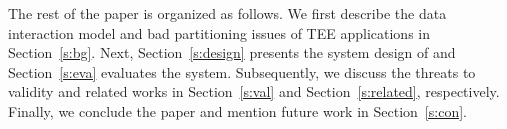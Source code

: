 The rest of the paper is organized as follows. We first describe the data interaction model and bad partitioning issues of TEE applications in Section~\ref{s:bg}. Next, Section~\ref{s:design} presents the system design of \ccSysName and Section~\ref{s:eva} evaluates the system. Subsequently, we discuss the threats to validity and related works in Section~\ref{s:val} and Section~\ref{s:related}, respectively. Finally, we conclude the paper and mention future work in Section~\ref{s:con}.
